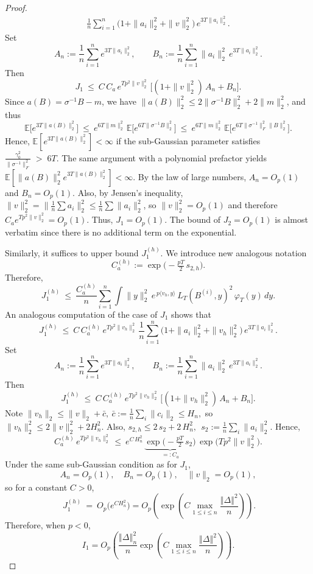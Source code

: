 \documentclass[11pt]{article}
\theoremstyle{definition}
\newcommand{\E}{\mathbb{E}}
\begin{document}
\begin{proof}
\begin{align*}
\frac{1}{n}\sum_{i=1}^n \big(1+\|a_i\|_2^2+\|v\|_2^2\big)\,e^{3T\|a_i\|_2^2}.
\end{align*}
Set
\[
A_n:=\frac1n\sum_{i=1}^n e^{3T\|a_i\|_2^2},\qquad
B_n:=\frac1n\sum_{i=1}^n \|a_i\|_2^2\,e^{3T\|a_i\|_2^2}.
\]
Then
\[
J_1\ \le\ C\,C_a\,e^{Tp^2\|v\|_2^2}\,\Big[(1+\|v\|_2^2)\,A_n + B_n\Big].
\]
Since $a(B)=\sigma^{-1}B-m$, we have
\(
\|a(B)\|_2^2 \le 2\|\sigma^{-1}B\|_2^2 + 2\|m\|_2^2
\),
and thus
\[
\E\big[e^{3T\|a(B)\|_2^2}\big]
\ \le\ e^{6T\|m\|_2^2}\,\E\big[e^{6T\|\sigma^{-1}B\|_2^2}\big]
\ \le\ e^{6T\|m\|_2^2}\,\E\big[e^{6T\|\sigma^{-1}\|_F^2\|B\|_2^2}\big].
\]
Hence, $\E[e^{3T\|a(B)\|_2^2}]<\infty$ if the sub-Gaussian parameter satisfies $\frac{\gamma_0^2}{\|\sigma^{-1}\|_F^2}\;>\;6T.$ The same argument with a polynomial prefactor yields
\(
\E[\|a(B)\|_2^2 e^{3T\|a(B)\|_2^2}]<\infty
\).
By the law of large numbers, $A_n=O_p(1)$ and $B_n=O_p(1)$. Also, by Jensen's inequality,
\(
\|v\|_2^2=\big\|\tfrac1n\sum a_i\big\|_2^2 \le \tfrac1n\sum \|a_i\|_2^2
\),
so $\|v\|_2^2=O_p(1)$ and therefore $C_a e^{Tp^2\|v\|_2^2}=O_p(1)$.
Thus, $J_1=O_p(1)$. The bound of $J_2 = O_p(1)$ is almost verbatim since there is no additional term on the exponential.

Similarly, it suffices to upper bound $J_1^{(h)}$. 
We introduce new analogous notation
\[
C_a^{(h)}:=\exp\!\Big(-\tfrac{pT}{2}\,s_{2,h}\Big).
\]
Therefore, 
\[
J_1^{(h)}
\ \le\ \frac{C_a^{(h)}}{n}\sum_{i=1}^n
\int \|y\|_2^2\,e^{\,p\langle v_h,y\rangle}\,L_T(B^{(i)},y)^2\,\varphi_T(y)\,dy.
\]
An analogous computation of the case of $J_1$ shows that
\[
J_1^{(h)}
\ \le\ C\,C_a^{(h)}\,e^{Tp^2\|v_h\|_2^2}\,
\frac{1}{n}\sum_{i=1}^n \big(1+\|a_i\|_2^2+\|v_h\|_2^2\big)\,e^{3T\|a_i\|_2^2}.
\]
Set
\[
A_n:=\frac1n\sum_{i=1}^n e^{3T\|a_i\|_2^2},\qquad
B_n:=\frac1n\sum_{i=1}^n \|a_i\|_2^2\,e^{3T\|a_i\|_2^2}.
\]
Then
\[
J_1^{(h)}
\ \le\ C\,C_a^{(h)}\,e^{Tp^2\|v_h\|_2^2}\,\Big[(1+\|v_h\|_2^2)\,A_n + B_n\Big].
\]
Note
\(
\|v_h\|_2\le \|v\|_2+\bar c,\ \bar c:=\tfrac1n\sum_i\|c_i\|_2\le H_n,
\)
so \(\|v_h\|_2^2\le 2\|v\|_2^2+2H_n^2\). Also, 
\(
s_{2,h}\le 2\,s_2+2\,H_n^2,\ \ s_2:=\tfrac1n\sum_i\|a_i\|_2^2.
\)
Hence, 
\[
C_a^{(h)}\,e^{Tp^2\|v_h\|_2^2}\ \le\ e^{C\,H_n^2}\,\underbrace{\exp\!\Big(-\tfrac{pT}{2}\,s_2\Big)}_{=:C_a}\,\exp\!\big(Tp^2\|v\|_2^2\big).
\]
Under the same sub-Gaussian condition as for $ J_1$,
\[
A_n=O_p(1),\quad B_n=O_p(1),\quad \|v\|_2=O_p(1),
\]
so for a constant $C>0$,
\[
\ J_1^{(h)}\ =\ O_p\!\big(e^{C H_n^2}\big) = O_p\left(\exp\left(C\max_{1\leq i \leq n}\frac{\left\Vert \Delta\right\Vert^2}{n}\right)\right). 
\]
Therefore, when $p < 0$,
$$I_1 = O_p\left(\frac{\left\Vert \Delta\right\Vert^2_n}{n}\exp\left(C\max_{1\leq i \leq n}\frac{\left\Vert \Delta\right\Vert^2}{n}\right)\right).$$


\end{proof}
\end{document}
